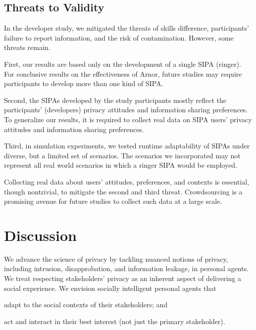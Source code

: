 \documentclass[11pt,          %
               phd,           %
               onehalfspacing %
               ]{ncsuthesis}
\newcommand{\frameworkA}{Arnor\xspace}
\begin{document}
\subsection{Threats to Validity}
\label{sec:threats-to-validity}

In the developer study, we mitigated the threats of skills difference,
participants' failure to report information, and the risk of
contamination. However, some threats remain.

First, our results are based only on the development of a single SIPA
(ringer). For conclusive results on the effectiveness of \frameworkA,
future studies may require participants to develop more than one kind of
SIPA.

Second, the SIPAs developed by the study participants mostly reflect the
participants' (developers) privacy attitudes and information sharing
preferences. To generalize our results, it is required to collect real
data on SIPA users' privacy attitudes and information sharing
preferences.

Third, in simulation experiments, we tested runtime adaptability of
SIPAs under diverse, but a limited set of scenarios. The scenarios we
incorporated may not represent all real world scenarios in which a
ringer SIPA would be employed.

Collecting real data about users' attitudes, preferences, and contexts
is essential, though nontrivial, to mitigate the second and third
threat. Crowdsourcing is a promising avenue for future studies to
collect such data at a large scale.

\section{Discussion}
\label{sec:arnor-related}

We advance the science of privacy by tackling nuanced notions of
privacy, including intrusion, disapprobation, and information leakage,
in personal agents. We treat respecting stakeholders' privacy as an
inherent aspect of delivering a social experience. We envision socially
intelligent personal agents that
\begin{enumerate*}[label=(\arabic*)]
\item adapt to the social contexts of their stakeholders; and
\item act and interact in their best interest (not just the primary stakeholder).  
\end{enumerate*}
\end{document}
